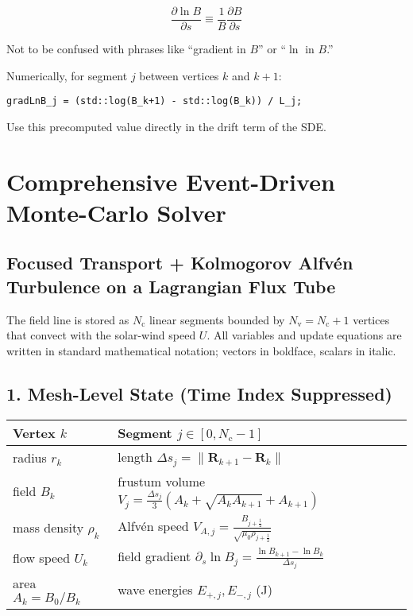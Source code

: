 {\begin{tcolorbox}
\[
\frac{\partial \ln B}{\partial s} \equiv \frac{1}{B} \frac{\partial B}{\partial s}
\]
\end{tcolorbox}

\noindent
Not to be confused with phrases like “gradient in $B$” or “$\ln$ in $B$.”

\medskip

\noindent
Numerically, for segment $j$ between vertices $k$ and $k+1$:

\begin{lstlisting}
gradLnB_j = (std::log(B_k+1) - std::log(B_k)) / L_j;
\end{lstlisting}

\noindent
Use this precomputed value directly in the drift term of the SDE.

\section*{Comprehensive Event-Driven Monte-Carlo Solver}

\subsection*{Focused Transport + Kolmogorov Alfvén Turbulence on a Lagrangian Flux Tube}

The field line is stored as \( N_{\mathrm{c}} \) linear segments bounded by \( N_{\mathrm{v}} = N_{\mathrm{c}} + 1 \) vertices that convect with the solar-wind speed \( U \). All variables and update equations are written in standard mathematical notation; vectors in boldface, scalars in italic.

\subsection*{1. Mesh-Level State (Time Index Suppressed)}

\begin{tabular}{|l|l|}
\hline
\textbf{Vertex \( k \)} & \textbf{Segment \( j \in [0, N_{\mathrm{c}}-1] \)} \\ \hline
radius \( r_k \) & length \( \Delta s_j = \lVert \mathbf{R}_{k+1} - \mathbf{R}_k \rVert \) \\ \hline
field \( B_k \) & frustum volume \( V_j = \frac{\Delta s_j}{3}\left(A_k + \sqrt{A_k A_{k+1}} + A_{k+1}\right) \) \\ \hline
mass density \( \rho_k \) & Alfvén speed \( V_{A,j} = \frac{B_{j+\frac12}}{\sqrt{\mu_0 \rho_{j+\frac12}}} \) \\ \hline
flow speed \( U_k \) & field gradient \( \partial_s \ln B_j = \frac{\ln B_{k+1} - \ln B_k}{\Delta s_j} \) \\ \hline
area \( A_k = B_0 / B_k \) & wave energies \( E_{+,j}, E_{-,j} \) (J) \\ \hline
\end{tabular}

}
